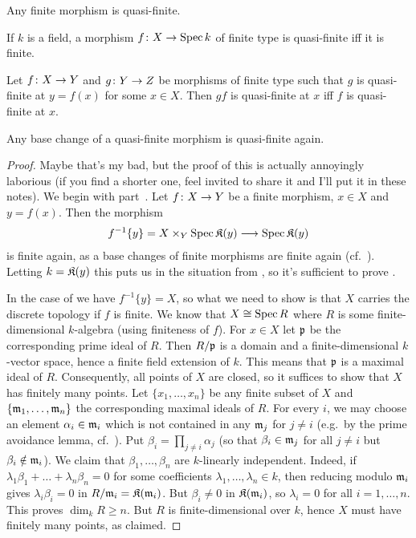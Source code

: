 \documentclass[a4paper,parskip=half,numbers=enddot, DIV=12]{scrreprt}
\renewcommand{\geq}{\geqslant}
\begin{document}
\begin{fact}
	\begin{alphanumerate}
		\item {}Any finite morphism is quasi-finite.
		\item If $k$ is a field, a morphism $f\colon X\morphism\Spec k$ of finite type is quasi-finite iff it is finite.
		\item Let $f\colon X\morphism Y$ and $g\colon Y\morphism Z$ be morphisms of finite type such that $g$ is quasi-finite at $y=f(x)$ for some $x\in X$. Then $gf$ is quasi-finite at $x$ iff $f$ is quasi-finite at $x$.
		\item Any base change of a quasi-finite morphism is quasi-finite again.
	\end{alphanumerate}
\end{fact}
\begin{proof}
	Maybe that's my bad, but the proof of this is actually annoyingly laborious (if you find a shorter one, feel invited to share it and I'll put it in these notes). We begin with part~. Let $f\colon X\morphism Y$ be a finite morphism, $x\in X$ and $y=f(x)$. Then the morphism
	\begin{align*}
		f^{-1}\{y\}=X\times_Y\Spec \KK(y)\morphism \Spec \KK(y)
	\end{align*}
	is finite again, as a base changes of finite morphisms are finite again (cf.\ \cite[Corollary~2.5.1]{alggeo1}). Letting $k=\mathfrak{K}(y)$ this puts us in the situation from , so it's sufficient to prove .
	
	In the case of  we have $f^{-1}\{y\}=X$, so what we need to show is that $X$ carries the discrete topology if $f$ is finite. We know that $X\cong \operatorname{Spec} R$ where $R$ is some finite-dimensional $k$-algebra (using finiteness of $f$). For $x\in X$ let $\mathfrak{p}$ be the corresponding prime ideal of $R$. Then $R/\mathfrak{p}$ is a domain and a finite-dimensional $k$-vector space, hence a finite field extension of $k$. This means that $\mathfrak{p}$ is a maximal ideal of $R$. Consequently, all points of $X$ are closed, so it suffices to show that $X$ has finitely many points. Let $\{x_1,\ldots,x_n\}$ be any finite subset of $X$ and $\{\mathfrak{m}_1,\ldots,\mathfrak{m}_n\}$ the corresponding maximal ideals of $R$. For every $i$, we may choose an element $\alpha_i\in\mathfrak{m}_i$ which is not contained in any $\mathfrak{m}_j$ for $j\neq i$ (e.g.\ by the prime avoidance lemma, cf.\ \cite[Lemma~2.5.1]{alg1}). Put $\beta_i=\prod_{j\neq i}\alpha_j$ (so that $\beta_i\in\mathfrak{m}_j$ for all $j\neq i$ but $\beta_i\notin \mathfrak{m}_i$). We claim that $\beta_1,\ldots,\beta_n$ are $k$-linearly independent. Indeed, if $\lambda_1\beta_1+\ldots+\lambda_n\beta_n=0$ for some coefficients $\lambda_1,\ldots,\lambda_n\in k$, then reducing modulo $\mathfrak{m}_i$ gives $\lambda_i\beta_i=0$ in $R/\mathfrak{m}_i=\mathfrak{K}(\mathfrak{m}_i)$. But $\beta_i\neq 0$ in $\mathfrak{K}(\mathfrak{m}_i)$, so $\lambda_i=0$ for all $i=1,\ldots,n$. This proves $\dim_kR\geq n$. But $R$ is finite-dimensional over $k$, hence $X$ must have finitely many points, as claimed.
	

\end{proof}
\end{document}
